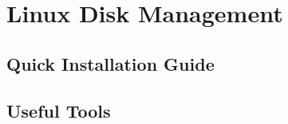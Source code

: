 \chapter{Linux Disk Management}


\section{Quick Installation Guide}




\section{Useful Tools}

















